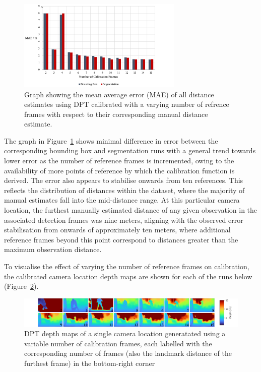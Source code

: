 \begin{figure}[H]
    \centering
    \includegraphics[width=0.7\textwidth]{body/analysis/assets/calibration_effects/MAE_var_cal}
    \caption{Graph showing the mean average error (MAE) of all distance estimates using DPT calibrated
        with a varying number of refrence frames with respect to their corresponding manual distance
        estimate.}
    \label{fig:MAE_var_cal}
\end{figure}

The graph in Figure~\ref{fig:MAE_var_cal} shows minimal difference in error between the corresponding
bounding box and segmentation runs with a general trend towards lower error as the number of reference
frames is incremented, owing to the availability of more points of reference by which the calibration
function is derived.
The error also appears to stabilise onwards from ten references.
This reflects the distribution of distances within the dataset, where the majority of
manual estimates fall into the mid-distance range.
At this particular camera location, the furthest manually estimated distance of any given
observation in the associated detection frames was nine meters, aligning with the observed error
stabilisation from onwards of approximately ten meters, where additional reference frames beyond this
point correspond to distances greater than the maximum observation distance.

To visualise the effect of varying the number of reference frames on calibration, the calibrated
camera location depth maps are shown for each of the runs below (Figure~\ref{fig:variable_calibration}).

\begin{figure}[H]
    \centering
    \includegraphics[width=1\textwidth]{body/analysis/assets/calibration_effects/variable_calibation}
    \caption{DPT depth maps of a single camera location generatated using a variable number of
        calibration frames, each labelled with the corresponding number of frames (also the landmark
        distance of the furthest frame) in the bottom-right corner}
    \label{fig:variable_calibration}
\end{figure}


